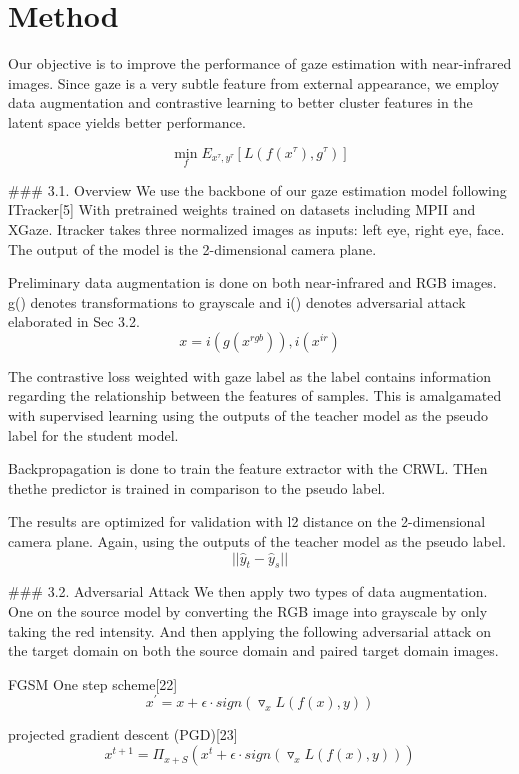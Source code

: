 \section{Method}
\label{sec:method}
Our objective is to improve the performance of gaze estimation with near-infrared images. Since gaze is a very subtle feature from external appearance, we employ data augmentation and contrastive learning to better cluster features in the latent space yields better performance. 

$$ \min_{f}E_{x^{\tau},y^{\tau}}[L(f(x^{\tau}),g^{\tau})] $$

### 3.1. Overview
We use the backbone of our gaze estimation model following ITracker[5] With pretrained weights trained on datasets including MPII and XGaze. Itracker takes three normalized images as inputs: left eye, right eye, face. The output of the model is the 2-dimensional camera plane. 

Preliminary data augmentation is done on both near-infrared and RGB images. g() denotes transformations to grayscale and i() denotes adversarial attack elaborated in Sec 3.2.
$$ x = i(g(x^{rgb})), i(x^{ir}) $$

The contrastive loss weighted with gaze label as the label contains information regarding the relationship between the features of samples. This is amalgamated with supervised learning using the outputs of the teacher model as the pseudo label for the student model. 

Backpropagation is done to train the feature extractor with the CRWL. THen thethe predictor is trained in comparison to the pseudo label. 

The results are optimized for validation with l2 distance on the 2-dimensional camera plane. Again, using the outputs of the teacher model as the pseudo label.    
$$ \lvert\lvert \hat{y}_{t} - \hat{y}_{s} \rvert\rvert $$

### 3.2. Adversarial Attack
We then apply two types of data augmentation. One on the source model by converting the RGB image into grayscale by only taking the red intensity. And then applying the following adversarial attack on the target domain on both the source domain and paired target domain images. 

FGSM One step scheme[22]  
$$ x^{\prime} = x + \epsilon \cdot sign(\triangledown_{x}L(f(x),y)) $$

projected gradient descent (PGD)[23]  
$$ x^{t+1} = \Pi_{x+S}(x^{t} + \epsilon \cdot sign(\triangledown_{x}L(f(x),y))) $$ 

